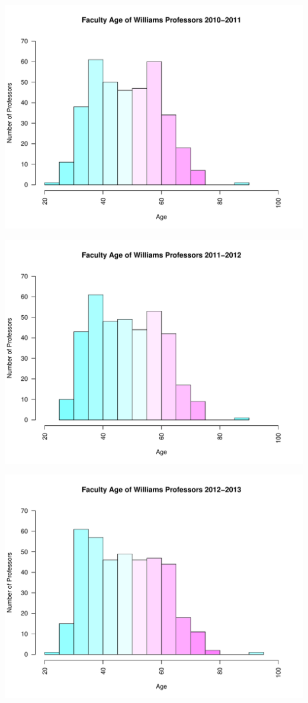 \documentclass[12pt,a4paper]{article}\usepackage[]{graphicx}\usepackage[]{color}
\makeatletter
\def\maxwidth{ %
  \ifdim\Gin@nat@width>\linewidth
    \linewidth
  \else
    \Gin@nat@width
  \fi
}
\newenvironment{knitrout}{}{} %
\theoremstyle{definition}
\makeatother
\begin{document}
\begin{knitrout}
\includegraphics[width=\maxwidth]{figure/unnamed-chunk-8-7} 

\includegraphics[width=\maxwidth]{figure/unnamed-chunk-8-8} 

\includegraphics[width=\maxwidth]{figure/unnamed-chunk-8-9} 


\end{knitrout}
\end{document}
